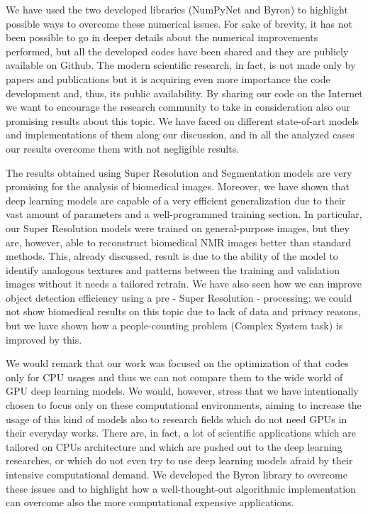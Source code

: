 \documentclass{standalone}
\begin{document}
We have used the two developed libraries (\textsf{NumPyNet} and \textsf{Byron}) to highlight possible ways to overcome these numerical issues.
For sake of brevity, it has not been possible to go in deeper details about the numerical improvements performed, but all the developed codes have been shared and they are publicly available on Github.
The modern scientific research, in fact, is not made only by papers and publications but it is acquiring even more importance the code development and, thus, its public availability.
By sharing our code on the Internet we want to encourage the research community to take in consideration also our promising results about this topic.
We have faced on different state-of-art models and implementations of them along our discussion, and in all the analyzed cases our results overcome them with not negligible results.

The results obtained using Super Resolution and Segmentation models are very promising for the analysis of biomedical images.
Moreover, we have shown that deep learning models are capable of a very efficient generalization due to their vast amount of parameters and a well-programmed training section.
In particular, our Super Resolution models were trained on general-purpose images, but they are, however, able to reconstruct biomedical NMR images better than standard methods.
This, already discussed, result is due to the ability of the model to identify analogous textures and patterns between the training and validation images without it needs a tailored retrain.
We have also seen how we can improve object detection efficiency using a pre - Super Resolution - processing: we could not show biomedical results on this topic due to lack of data and privacy reasons, but we have shown how a people-counting problem (Complex System task) is improved by this.

We would remark that our work was focused on the optimization of that codes only for CPU usages and thus we can not compare them to the wide world of GPU deep learning models.
We would, however, stress that we have intentionally chosen to focus only on these computational environments, aiming to increase the usage of this kind of models also to research fields which do not need GPUs in their everyday works.
There are, in fact, a lot of scientific applications which are tailored on CPUs architecture and which are pushed out to the deep learning researches, or which do not even try to use deep learning models afraid by their intensive computational demand.
We developed the \textsf{Byron} library to overcome these issues and to highlight how a well-thought-out algorithmic implementation can overcome also the more computational expensive applications.
\end{document}

